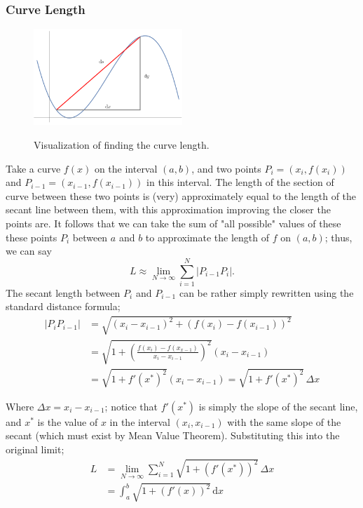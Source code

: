 \documentclass[12pt]{article}
\begin{document}
\subsubsection{Curve Length}

\begin{figure}[!ht]
    \centering
    \includegraphics[width=0.5\textwidth]{misc/curvelength.png}
    \label{fig:curve_length}
    \caption{Visualization of finding the curve length.}
\end{figure}
Take a curve $f(x)$ on the interval $(a,b)$, and two points $P_i = (x_i, f(x_i))$ and $P_{i-1} = (x_{i-1}, f(x_{i-1}))$ in this interval. The length of the section of curve between these two points is (very) approximately equal to the length of the secant line between them, with this approximation improving the closer the points are. It follows that we can take the sum of "all possible" values of these these points $P_i$ between $a$ and $b$ to approximate the length of $f$ on $(a,b)$; thus, we can say \[L \approx \lim_{N \to \infty} \sum_{i=1}^N |P_{i-1}P_{i}|.\] The secant length between $P_i$ and $P_{i-1}$ can be rather simply rewritten using the standard distance formula; \begin{align*}
    |P_i P_{i-1}| &= \sqrt{(x_i- x_{i-1})^2 + (f(x_i) - f(x_{i-1}))^2}\\
    &= \sqrt{1 + (\frac{f(x_i) - f(x_{x-1})}{x_i - x_{i-1}})^2} (x_i - x_{i-1})\\
    &= \sqrt{1 + f'(x^*)^2} (x_i - x_{i-1}) = \sqrt{1 + f'(x^*)^2}\, \Delta x
\end{align*}

Where $\Delta x = x_i - x_{i-1}$; notice that $f'(x^*)$ is simply the slope of the secant line, and $x^*$ is the value of $x$ in the interval $(x_i, x_{i-1})$ with the same slope of the secant (which must exist by Mean Value Theorem). Substituting this into the original limit; \begin{align*}L &= \lim_{N \to \infty} \sum_{i =1}^N \sqrt{1 + (f'(x^*))^2} \,\Delta x\\
    &= \int_{a}^{b} \sqrt{1 + (f'(x))^2} \,\text{d}x
\end{align*}
\end{document}
